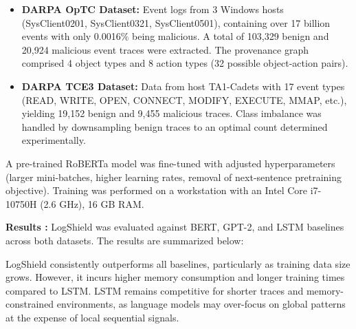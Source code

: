 \begin{itemize}
    \item \textbf{DARPA OpTC Dataset:} Event logs from 3 Windows hosts (SysClient0201, SysClient0321, SysClient0501), containing over 17 billion events with only 0.0016\% being malicious. A total of 103,329 benign and 20,924 malicious event traces were extracted. The provenance graph comprised 4 object types and 8 action types (32 possible object-action pairs).
    \item \textbf{DARPA TCE3 Dataset:} Data from host TA1-Cadets with 17 event types (READ, WRITE, OPEN, CONNECT, MODIFY, EXECUTE, MMAP, etc.), yielding 19,152 benign and 9,455 malicious traces. Class imbalance was handled by downsampling benign traces to an optimal count determined experimentally.
\end{itemize}

A pre-trained RoBERTa model was fine-tuned with adjusted hyperparameters (larger mini-batches, higher learning rates, removal of next-sentence pretraining objective). Training was performed on a workstation with an Intel Core i7-10750H (2.6 GHz), 16 GB RAM.

\textbf{Results \cite{anjum2023logshield}:} LogShield was evaluated against BERT, GPT-2, and LSTM baselines across both datasets. The results are summarized below:

\begin{table}[H]
\centering
\caption{Performance Comparison of LogShield with Baseline Models on DARPA Datasets}
\medskip
{}
\end{table}

LogShield consistently outperforms all baselines, particularly as training data size grows. However, it incurs higher memory consumption and longer training times compared to LSTM. LSTM remains competitive for shorter traces and memory-constrained environments, as language models may over-focus on global patterns at the expense of local sequential signals.

